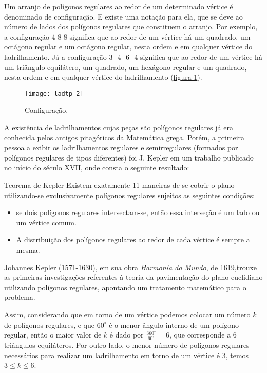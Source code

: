 Um arranjo de polígonos regulares ao redor de um determinado vértice é denominado de configuração. E existe uma notação para ela, que se deve ao número de lados dos polígonos regulares que constituem o arranjo. Por exemplo, a configuração 4-8-8 significa que ao redor de um vértice há um quadrado,  um octágono regular e um octágono regular, nesta ordem e em qualquer vértice do ladrilhamento. Já a configuração 3- 4- 6- 4 significa que ao redor de um vértice há um triângulo equilátero, um quadrado, um hexágono regular e um quadrado, nesta ordem e em qualquer vértice do ladrilhamento (\hyperref[lad_tp2]{figura \ref{lad_tp2}}).


\begin{figure}[H]
\centering
\texttt{[image: ladtp\_2]}
\caption{Configuração.}
\label{lad_tp2}
\end{figure}

A existência de ladrilhamentos  cujas peças são polígonos regulares já era conhecida pelos antigos pitagóricos da Matemática grega. Porém, a primeira pessoa a exibir os ladrilhamentos regulares e semirregulares (formados por polígonos regulares de tipos diferentes) foi J. Kepler em um trabalho publicado no início do século XVII, onde consta o seguinte resultado:

\begin{observation}{Teorema de Kepler}
Existem exatamente 11 maneiras de se cobrir o plano utilizando-se exclusivamente polígonos regulares sujeitos as seguintes condições:
\begin{itemize}
\item	se dois polígonos regulares intersectam-se, então essa interseção é um lado ou um vértice comum.
\item	A distribuição dos polígonos regulares ao redor de cada vértice é sempre a mesma.
\end{itemize}

\end{observation}



\begin{knowledge}
Johannes Kepler (1571-1630), em sua obra \textit{Harmonia do Mundo}, de 1619,trouxe as primeiras investigações referentes à teoria da pavimentação do plano euclidiano utilizando polígonos regulares, apontando um tratamento matemático para o problema.
\end{knowledge}




Assim, considerando que em torno de um vértice podemos colocar um número $k$ de polígonos regulares, e que $60^{\circ}$ é o menor ângulo interno de um polígono regular, então o maior valor de $k$ é dado por $\displaystyle \frac{360^{\circ}}{60^{\circ}} = 6$, que corresponde a 6 triângulos equiláteros. Por outro lado, o menor número de polígonos regulares  necessários para realizar um ladrilhamento em torno de um vértice é 3, temos  $3\leq k \leq 6$.


